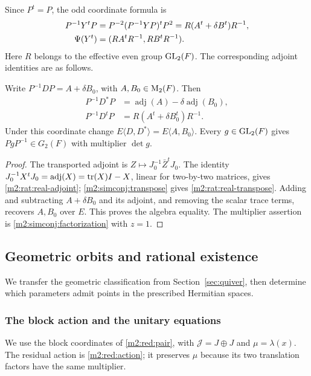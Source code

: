 Since $P^t=P$, the odd coordinate formula is
\begin{align}
 P^{-1}Y^tP
 &=P^{-2}(P^{-1}YP)^tP^2
   =R(A^t+\delta B^t)R^{-1},\notag\\
 \Psi(Y^t)&=(RA^tR^{-1},RB^tR^{-1}).
 \label{m2:simconj:transpose}
\end{align}
Here $R$ belongs to the effective even group $\operatorname{GL}_2(F)$.
The corresponding adjoint identities are as follows.

\begin{lemma}\label{m2:rat:real-pair}
Write $P^{-1}DP=A+\delta B_0$, with
$A,B_0\in\operatorname{M}_2(F)$.  Then
\begin{align}
 P^{-1}D^*P&=\operatorname{adj}(A)
                      -\delta\operatorname{adj}(B_0),
               \label{m2:rat:real-adjoint}\\
 P^{-1}D^tP&=R(A^t+\delta B_0^t)R^{-1}.
               \label{m2:rat:real-transpose}
\end{align}
Under this coordinate change
$E\langle D,D^*\rangle=E\langle A,B_0\rangle$.
Every $g\in\operatorname{GL}_2(F)$ gives $PgP^{-1}\in G_2(F)$
with multiplier $\det g$.
\end{lemma}

\begin{proof}
The transported adjoint is $Z\mapsto J_0^{-1}\bar Z^tJ_0$.
The identity
$J_0^{-1}X^tJ_0=\operatorname{adj}(X)=\operatorname{tr}(X)I-X$, linear for
two-by-two matrices, gives \eqref{m2:rat:real-adjoint};
\eqref{m2:simconj:transpose} gives \eqref{m2:rat:real-transpose}.
Adding and subtracting $A+\delta B_0$ and its adjoint, and removing
the scalar trace terms, recovers $A,B_0$ over $E$. This proves the
algebra equality. The multiplier assertion is
\cref{m2:simconj:factorization} with $z=1$.
\end{proof}


\subsection{Geometric orbits and rational existence}\label{m2:geo:section}

We transfer the geometric classification from Section~\ref{sec:quiver},
then determine which parameters admit points in the prescribed Hermitian spaces.

\subsubsection{The block action and the unitary equations}

We use the block coordinates of \cref{m2:red:pair}, with
$\mathcal J=J\oplus J$ and $\mu=\lambda(x)$.
The residual action is \eqref{m2:red:action}; it preserves $\mu$
because its two translation factors have the same multiplier.

